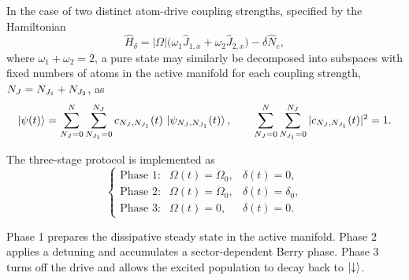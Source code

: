 \documentclass[a4paper,11pt]{article}
\begin{document}
In the case of two distinct atom-drive coupling strengths, specified by the Hamiltonian
\begin{equation}
    \hat H_\delta = |\Omega| \big( \omega_1 \hat J_{1,x}
    + \omega_2 \hat J_{2,x} \big)
    - \delta \hat N_e,
\end{equation}
where $\omega_1 + \omega_2 = 2$, a pure state may similarly be decomposed into subspaces with fixed numbers of atoms in the active manifold for each coupling strength, $N_J = N_{J_1} + N_{J_2}$, as
\begin{equation}
    \ket{\psi(t)}
    = \sum_{N_J=0}^{N}
    \sum_{N_{J_1}=0}^{N_J}
    c_{N_J,N_{J_1}}(t)\,\ket{\psi_{N_J,N_{J_1}}(t)},
    \qquad
    \sum_{N_J=0}^{N} \sum_{N_{J_1}=0}^{N_J} |c_{N_J,N_{J_1}}(t)|^2 = 1.
\end{equation}
\par

The three-stage protocol is implemented as
\begin{equation}
    \left\{
    \begin{array}{lll}
        \text{Phase 1:} & \Omega(t)=\Omega_0, & \delta(t)=0,        \\
        \text{Phase 2:} & \Omega(t)=\Omega_0, & \delta(t)=\delta_0, \\
        \text{Phase 3:} & \Omega(t)=0,        & \delta(t)=0.
    \end{array}
    \right.
\end{equation}
\par

Phase 1 prepares the dissipative steady state in the active manifold. Phase 2 applies a detuning and accumulates a sector-dependent Berry phase. Phase 3 turns off the drive and allows the excited population to decay back to $\ket{\downarrow}$.

\printbibliography
\end{document}
